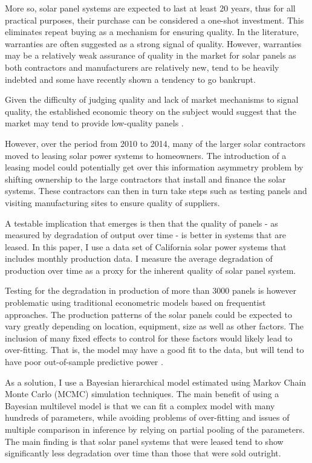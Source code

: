 \documentclass[12pt]{article}
\begin{document}
More so, solar panel systems are expected to last at least 20 years, thus for all practical purposes, their purchase can be considered a one-shot investment. This eliminates repeat buying as a mechanism for ensuring quality. In the literature, warranties are often suggested as a strong signal of quality. However, warranties may be a relatively weak assurance of quality in the market for solar panels as both contractors and manufacturers are relatively new, tend to be heavily indebted and some have recently shown a tendency to go bankrupt.

Given the difficulty of judging quality and lack of market mechanisms to signal quality, the established economic theory on the subject would suggest that the market may tend to provide low-quality panels \citet{tirole_theory_1988}.

However, over the period from 2010 to 2014, many of the larger solar contractors moved to leasing solar power systems to homeowners. The introduction of a leasing model could potentially get over this information asymmetry problem by shifting ownership to the large contractors that install and finance the solar systems. These contractors can then in turn take steps such as testing panels and visiting manufacturing sites to ensure quality of suppliers.

A testable implication that emerges is then that the quality of panels - as measured by degradation of output over time - is better in systems that are leased.  In this paper, I use a data set of California solar power systems that includes monthly production data. I measure the average degradation of production over time as a proxy for the inherent quality of solar panel system.

Testing for the degradation in production of more than 3000 panels is however problematic using traditional econometric models based on frequentist approaches. The production patterns of the solar panels could be expected to vary greatly depending on location, equipment, size as well as other factors. The inclusion of many fixed effects to control for these factors would likely lead to over-fitting. That is, the model may have a good fit to the data, but will tend to have poor out-of-sample predictive power \citep{gelman_bayesian_2013}.

As a solution, I use a Bayesian hierarchical model estimated using Markov Chain Monte Carlo (MCMC) simulation techniques. The main benefit of using a Bayesian multilevel model is that we can fit a complex model with many hundreds of parameters, while avoiding problems of over-fitting and issues of multiple comparison in inference by relying on partial pooling of the parameters. The main finding is that solar panel systems that were leased tend to show significantly less degradation over time than those that were sold outright.
\end{document}
